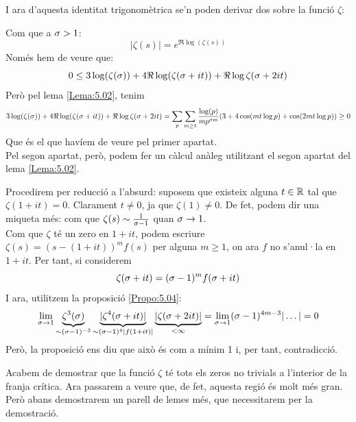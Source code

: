 I ara d'aquesta identitat trigonomètrica se'n poden derivar dos sobre la funció $\zeta$:
\begin{pf}
    Com que a $\sigma>1$:
    \[
        |\zeta(s)|=e^{\Re\log(\zeta(s))}
    \]
    Només hem de veure que:
    \[
        0\leq 3\log(\zeta(\sigma))+4\Re\log(\zeta(\sigma+it))+\Re\log\zeta(\sigma+2it)
    \]
    Però pel lema \ref{Lema:5.02}, tenim
    \[
        3\log(\zeta(\sigma))+4\Re\log(\zeta(\sigma+it))+\Re\log\zeta(\sigma+2it)=\sum_{p}\sum_{m\geq1}\frac{\log(p)}{mp^{\sigma m}}(3+4\cos(mt\log p)+\cos(2mt\log p))\geq0
    \]
    Que és el que havíem de veure pel primer apartat.\\
    Pel segon apartat, però, podem fer un càlcul anàleg utilitzant el segon apartat del lema \ref{Lema:5.02}.
\end{pf}
\begin{pf}
    Procedirem per reducció a l'absurd: suposem que existeix alguna $t\in \mathbb R$ tal que $\zeta(1+it)=0$. Clarament $t\neq0$, ja que $\zeta(1)\neq0$. De fet, podem dir una miqueta més: com que $\zeta(s)\sim \frac{1}{\sigma-1}$ quan $\sigma\to 1$.\\
    Com que $\zeta$ té un zero en $1+it$, podem escriure $\zeta(s)=(s-(1+it))^mf(s)$ per alguna $m\geq1$, on ara $f$ no s'anul·la en $1+it$. Per tant, si considerem
    \[
        \zeta(\sigma+it)=(\sigma-1)^m f(\sigma+it)
    \]
    I ara, utilitzem la proposició \ref{Propo:5.04}:
    \[
        \lim_{\sigma\to 1}\underbrace{\zeta^3(\sigma)}_{\sim (\sigma-1)^{-3}}
        \underbrace{|\zeta^4(\sigma+it)|}_{\sim(\sigma-1)^4|f(1+it)|}
        \underbrace{|\zeta(\sigma+2it)|}_{<\infty}=\lim_{\sigma\to 1}(\sigma-1)^{4m-3}|\dots|= 0
    \]
    Però, la proposició ens diu que això és com a mínim 1 i, per tant, contradicció.
\end{pf}
Acabem de demostrar que la funció $\zeta$ té tots els zeros no trivials a l'interior de la franja crítica. Ara passarem a veure que, de fet, aquesta regió és molt més gran. Però abans demostrarem un parell de lemes més, que necessitarem per la demostració.
